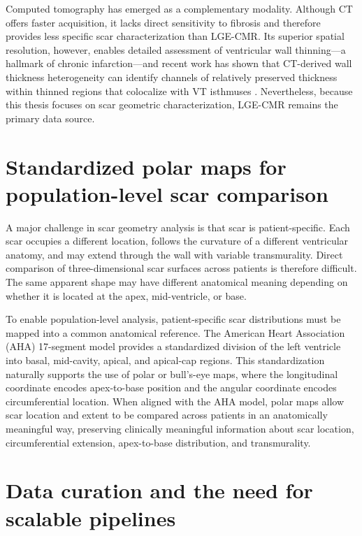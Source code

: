 Computed tomography has emerged as a complementary modality. Although CT offers faster acquisition, it lacks direct sensitivity
to fibrosis and therefore provides less specific scar characterization than LGE-CMR. Its
superior spatial resolution, however, enables detailed assessment of ventricular wall
thinning---a hallmark of chronic infarction---and recent work has shown that CT-derived wall
thickness heterogeneity can identify channels of relatively preserved thickness within thinned
regions that colocalize with VT isthmuses \cite{cedilnik2023}. Nevertheless, because this
thesis focuses on scar geometric characterization, LGE-CMR remains the primary data
source.

\section*{Standardized polar maps for population-level scar comparison}

A major challenge in scar geometry analysis is that scar is patient-specific. Each scar
occupies a different location, follows the curvature of a different ventricular anatomy, and
may extend through the wall with variable transmurality. Direct comparison of
three-dimensional scar surfaces across patients is therefore difficult. The same apparent
shape may have different anatomical meaning depending on whether it is located at the
apex, mid-ventricle, or base.

To enable population-level analysis, patient-specific scar distributions must be mapped into a
common anatomical reference. The American Heart Association (AHA) 17-segment model \cite{cerqueira2002}
provides a standardized division of the left ventricle into basal, mid-cavity, apical, and
apical-cap regions. This standardization naturally supports the use of polar or bull's-eye
maps, where the longitudinal coordinate encodes apex-to-base position and the angular
coordinate encodes circumferential location. When aligned with the AHA model, polar maps
allow scar location and extent to be compared across patients in an anatomically meaningful
way, preserving clinically meaningful information about scar location, circumferential
extension, apex-to-base distribution, and transmurality.

\section*{Data curation and the need for scalable pipelines}

